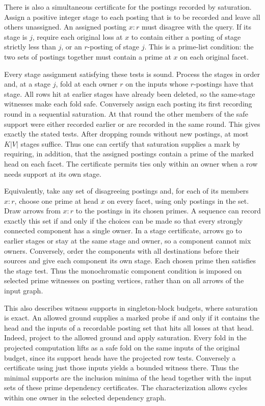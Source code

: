There is also a simultaneous certificate for the
postings recorded by saturation. Assign a positive
integer stage to each posting that is to be
recorded and leave all others unassigned. An
assigned posting $x:r$ must disagree with the
query. If its stage is $j$, require each original
loss at $x$ to contain either a posting of stage
strictly less than $j$, or an $r$-posting of
stage $j$. This is a prime-list condition: the
two sets of postings together must contain a
prime at $x$ on each original facet.

Every stage assignment satisfying these tests is
sound. Process the stages in order and, at a
stage $j$, fold at each owner $r$ on the inputs
whose $r$-postings have that stage. All rows hit
at earlier stages have already been deleted, so
the same-stage witnesses make each fold safe.
Conversely assign each posting its first
recording round in a sequential saturation.
At that round the other members of the safe
support were either recorded earlier or are
recorded in the same round. This gives exactly
the stated tests. After dropping rounds without
new postings, at most $K|V|$ stages suffice.
Thus one can certify that saturation supplies a
mark by requiring, in addition, that the assigned
postings contain a prime of the marked head on
each facet. The certificate permits ties only
within an owner when a row needs support at
its own stage.

Equivalently, take any set of disagreeing postings
and, for each of its members $x:r$, choose one
prime at head $x$ on every facet, using only
postings in the set. Draw arrows from $x:r$ to the
postings in its chosen primes. A sequence can
record exactly this set if and only if the choices
can be made
so that every strongly connected component has
a single owner. In a stage certificate, arrows
go to earlier stages or stay at the same stage
and owner, so a component cannot mix owners.
Conversely, order the components with all
destinations before their sources and give each
component its own stage. Each chosen prime then
satisfies the stage test. Thus the monochromatic
component condition is imposed on selected prime
witnesses on posting vertices, rather than on all
arrows of the input graph.

This also describes witness supports in
singleton-block budgets, where saturation is
exact. An allowed ground supplies a marked
probe if and only if it contains the head and
the inputs of a recordable posting set that
hits all losses at that head. Indeed, project
to the allowed ground and apply saturation.
Every fold in the projected computation lifts
as a safe fold on the same inputs of the
original budget, since its support heads
have the projected row tests. Conversely a
certificate using just those inputs yields
a bounded witness there. Thus the minimal
supports are the inclusion minima of the
head together with the input sets of these
prime dependency certificates. The
characterization allows cycles within one
owner in the selected dependency graph.

